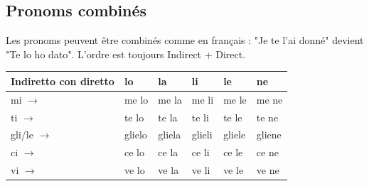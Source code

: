 \documentclass[12pt, openany]{report}
\begin{document}
\subsection{Pronoms combinés}
Les pronoms peuvent être combinés comme en français : "Je te l'ai donné" devient "Te lo ho dato". L'ordre est toujours Indirect + Direct. 
\begin{center}
\setlength{\tabcolsep}{10pt} 
\renewcommand{\arraystretch}{1.3} 
\begin{tabular}{p{2.5cm}|p{1.8cm}|p{1.8cm}|p{1.8cm}|p{1.8cm}|p{1.8cm}}
    \textbf{Indiretto con diretto} & lo & la & li & le & ne \\ \hline 
    mi $\rightarrow$ & me lo & me la & me li & me le & me ne\\ 
    ti $\rightarrow$ & te lo & te la & te li & te le & te ne\\
    gli/le $\rightarrow$ & glielo & gliela & glieli & gliele & gliene\\
    ci $\rightarrow$ & ce lo & ce la & ce li & ce le & ce ne\\
    vi $\rightarrow$ & ve lo & ve la & ve li & ve le & ve ne\\
\end{tabular}
\end{center}
\end{document}
